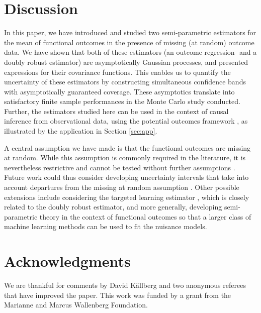 \documentclass[12pt, A4]{article}
\begin{document}
        \section{Discussion}
        In this paper, we have introduced and studied two semi-parametric estimators for the mean of functional outcomes in the presence of missing (at random) outcome data. 
        We have shown that both of these estimators (an outcome regression- and a doubly robust estimator) are asymptotically Gaussian processes, and presented expressions for their covariance functions. This enables us to quantify the uncertainty of these estimators by constructing simultaneous confidence bands with asymptotically guaranteed coverage. 
        These asymptotics translate into satisfactory finite sample performances in the Monte Carlo study conducted. 
        Further, the estimators studied here can be used in the context of causal inference from observational data, using the potential outcomes framework \cite{missingcausal}, as illustrated by the application in Section \ref{sec:app}.    

        A central assumption we have made is that the functional outcomes are missing at random. While this assumption is commonly required in the literature, it is nevertheless restrictive and cannot be tested without further assumptions \cite{molenberghs2015handbook}. 
        Future work could thus consider developing uncertainty intervals that take into account departures from the missing at random assumption \cite{vansteelandt2006ignorance, genback2015uncertainty}. 
        Other possible extensions include considering the targeted learning estimator \citep{tmle}, which is closely related to the doubly robust estimator, and more generally, developing semi-parametric theory in the context of functional outcomes so that a larger class of machine learning methods can be used to fit the nuisance models.



\section*{Acknowledgments}
We are thankful for comments by David Källberg and two anonymous referees that have improved the paper.
This work was funded by a grant from the Marianne and Marcus Wallenberg Foundation.
\end{document}
